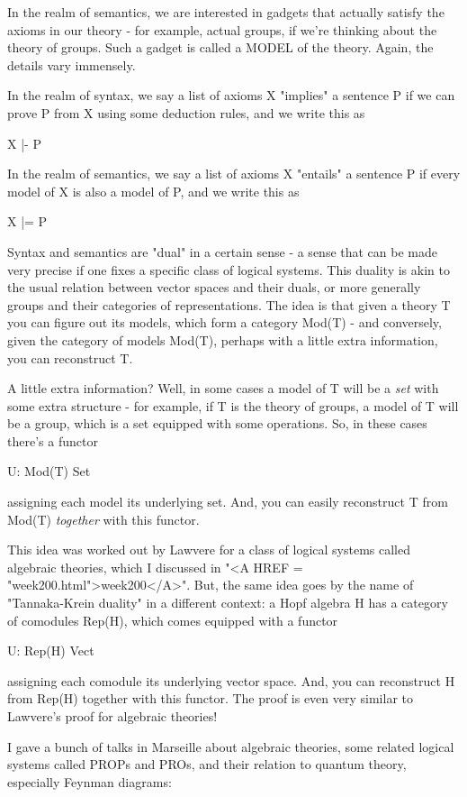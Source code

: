 In the realm of semantics, we are interested in gadgets that actually
satisfy the axioms in our theory - for example, actual groups, if we're 
thinking about the theory of groups.  Such a gadget is called a MODEL
of the theory.  Again, the details vary immensely. 

In the realm of syntax, we say a list of axioms X "implies" a 
sentence P if we can prove P from X using some deduction rules, and we write 
this as 

X |- P

In the realm of semantics, we say a list of axioms X "entails" a 
sentence P if every model of X is also a model of P, and we write this as

X |= P

Syntax and semantics are "dual" in a certain sense - a sense that can
be made very precise if one fixes a specific class of logical systems.
This duality is akin to the usual relation between vector spaces and 
their duals, or more generally groups and their categories of 
representations.  The idea is that given a theory T you can figure 
out its models, which form a category Mod(T) - and conversely, given the 
category of models Mod(T), perhaps with a little extra information, 
you can reconstruct T.  

A little extra information?  Well, in some cases a model of T will be
a \emph{set} with some extra structure - for example, if T is the theory of
groups, a model of T will be a group, which is a set equipped with some 
operations.  So, in these cases there's a functor

U: Mod(T) \to  Set 

assigning each model its underlying set.  And, you can easily reconstruct T
from Mod(T) \emph{together} with this functor.  

This idea was worked out by Lawvere for a class of logical systems 
called algebraic theories, which I discussed in 
"<A HREF = "week200.html">week200</A>".   But, the 
same idea goes by the name of "Tannaka-Krein duality" in a 
different context: a Hopf algebra H has a category of comodules Rep(H), 
which comes equipped with a functor 

U: Rep(H) \to  Vect

assigning each comodule its underlying vector space.  And, you can 
reconstruct H from Rep(H) together with this functor.  The proof is
even very similar to Lawvere's proof for algebraic theories!

I gave a bunch of talks in Marseille about algebraic theories, some 
related logical systems called PROPs and PROs, and their relation to 
quantum theory, especially Feynman diagrams:

